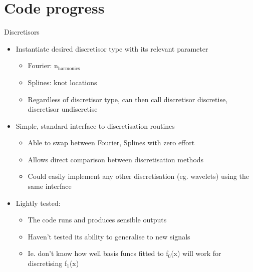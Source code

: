 \documentclass[presentation]{beamer}
\begin{document}
\section{Code progress}
\label{sec:org9cec4fb}
\begin{frame}[plain,label={sec:org02409ff}]{Discretisors}
\begin{itemize}
\item Instantiate desired discretisor type with its relevant parameter
\begin{itemize}
\item Fourier: n\(_{\text{harmonics}}\)
\item Splines: knot locations
\item Regardless of discretisor type, can then call discretisor discretise, discretisor undiscretise
\end{itemize}

\item Simple, standard interface to discretisation routines
\begin{itemize}
\item Able to swap between Fourier, Splines with zero effort
\item Allows direct comparison between discretisation methods
\item Could easily implement any other discretisation (eg. wavelets) using the same interface
\end{itemize}

\item Lightly tested:
\begin{itemize}
\item The code runs and produces sensible outputs
\item Haven't tested its ability to generalise to new signals
\item Ie. don't know how well basis funcs fitted to f\(_{\text{0}}\)(x) will work for discretising f\(_{\text{1}}\)(x)
\end{itemize}
\end{itemize}
\end{frame}
\end{document}
